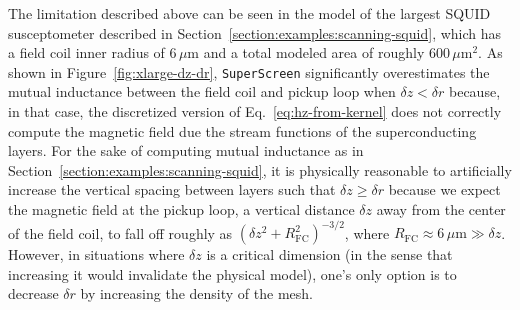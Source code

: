 \documentclass[final,3p,times,twocolumn]{elsarticle}
\newcommand{\inline}[1]{\texttt{#1}\xspace}
\newcommand{\SuperScreen}{\inline{SuperScreen}}
\newcommand{\um}{\mu\mathrm{m}}
\begin{document}
The limitation described above can be seen in the model of the largest SQUID susceptometer described in Section~\ref{section:examples:scanning-squid}, which has a field coil inner radius of $6\,\um$ and a total modeled area of roughly $600\,\um^2$. As shown in Figure~\ref{fig:xlarge-dz-dr}, \SuperScreen significantly overestimates the mutual inductance between the field coil and pickup loop when $\delta z <\delta r$ because, in that case, the discretized version of Eq.~\ref{eq:hz-from-kernel} does not correctly compute the magnetic field due the stream functions of the superconducting layers. For the sake of computing mutual inductance as in Section~\ref{section:examples:scanning-squid}, it is physically reasonable to artificially increase the vertical spacing between layers such that $\delta z\geq \delta r$ because we expect the magnetic field at the pickup loop, a vertical distance $\delta z$ away from the center of the field coil, to fall off roughly as $\left(\delta z^2 + R^2_\mathrm{FC}\right)^{-3/2}$, where $R_\mathrm{FC}\approx 6\,\um\gg\delta z$. However, in situations where $\delta z$ is a critical dimension (in the sense that increasing it would invalidate the physical model), one's only option is to decrease $\delta r$ by increasing the density of the mesh.
\end{document}
